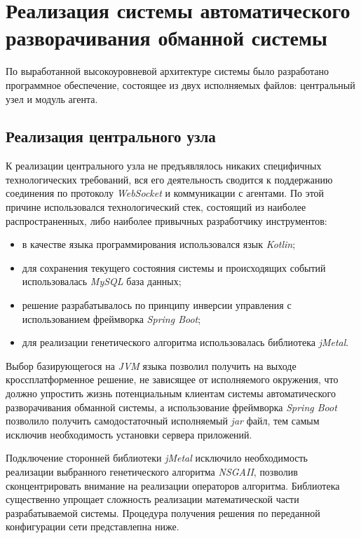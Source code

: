 \section{Реализация системы автоматического разворачивания обманной системы}

По выработанной высокоуровневой архитектуре системы было разработано программное обеспечение, состоящее из двух исполняемых файлов: центральный узел и модуль агента.

\subsection{Реализация центрального узла}

К реализации центрального узла не предъявлялось никаких специфичных технологических требований, вся его деятельность сводится к поддержанию соединения по протоколу \textit{WebSocket} и коммуникации с агентами. По этой причине использовался технологический стек, состоящий из наиболее распространенных, либо наиболее привычных разработчику инструментов:
\begin{itemize}
	\item в качестве языка программирования использовался язык \textit{Kotlin};
	\item для сохранения текущего состояния системы и происходящих событий использовалась \textit{MySQL} база данных;
	\item решение разрабатывалось по принципу инверсии управления с использованием фреймворка \textit{Spring Boot};
	\item для реализации генетического алгоритма использовалась библиотека \textit{jMetal}.
\end{itemize}

Выбор базирующегося на \textit{JVM} языка позволил получить на выходе кроссплатформенное решение, не зависящее от исполняемого окружения, что должно упростить жизнь потенциальным клиентам системы автоматического разворачивания обманной системы, а использование фреймворка \textit{Spring Boot} позволило получить самодостаточный исполняемый \textit{jar} файл, тем самым исключив необходимость установки сервера приложений.

Подключение сторонней библиотеки \textit{jMetal} исключило необходимость реализации выбранного генетического алгоритма \textit{NSGAII}, позволив сконцентрировать внимание на реализации операторов алгоритма. Библиотека существенно упрощает сложность реализации математической части разрабатываемой системы. Процедура получения решения по переданной конфигурации сети представлепна ниже.

